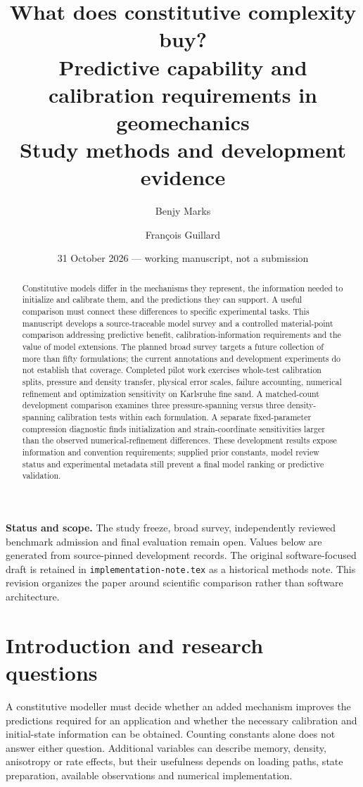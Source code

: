 \documentclass[11pt,a4paper]{article}
\title{\textbf{What does constitutive complexity buy?}\\[5pt]
\large Predictive capability and calibration requirements in geomechanics\\
\normalsize Study methods and development evidence}
\author{Benjy Marks \and Fran\c{c}ois Guillard}
\date{31 October 2026 --- working manuscript, not a submission}
\begin{document}
\maketitle
\begin{abstract}
Constitutive models differ in the mechanisms they represent, the information needed to initialize and calibrate them, and the predictions they can support. A useful comparison must connect these differences to specific experimental tasks. This manuscript develops a source-traceable model survey and a controlled material-point comparison addressing predictive benefit, calibration-information requirements and the value of model extensions. The planned broad survey targets a future collection of more than fifty formulations; the current annotations and development experiments do not establish that coverage. Completed pilot work exercises whole-test calibration splits, pressure and density transfer, physical error scales, failure accounting, numerical refinement and optimization sensitivity on Karlsruhe fine sand. A matched-count development comparison examines three pressure-spanning versus three density-spanning calibration tests within each formulation. A separate fixed-parameter compression diagnostic finds initialization and strain-coordinate sensitivities larger than the observed numerical-refinement differences. These development results expose information and convention requirements; supplied prior constants, model review status and experimental metadata still prevent a final model ranking or predictive validation.
\end{abstract}

\textbf{Status and scope.} The study freeze, broad survey, independently reviewed benchmark admission and final evaluation remain open. Values below are generated from source-pinned development records. The original software-focused draft is retained in \texttt{implementation-note.tex} as a historical methods note. This revision organizes the paper around scientific comparison rather than software architecture.

\section{Introduction and research questions}
A constitutive modeller must decide whether an added mechanism improves the predictions required for an application and whether the necessary calibration and initial-state information can be obtained. Counting constants alone does not answer either question. Additional variables can describe memory, density, anisotropy or rate effects, but their usefulness depends on loading paths, state preparation, available observations and numerical implementation.
\end{document}
